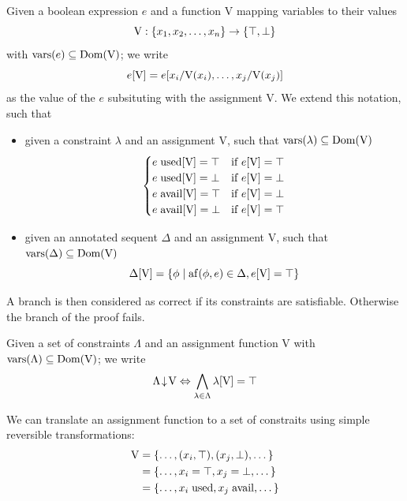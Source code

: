 \documentclass[a4paper, 12pt, english]{report}
\begin{document}
\begin{define}[Evaluation]
	Given a boolean expression $e$ and a function V mapping variables to their values 
	$$ \mathrm{V} : \{ x_1, x_2, \dots, x_n \} \rightarrow \{ \top, \bot \} $$
	with $\text{vars}(e) \subseteq \text{Dom}(\mathrm{V})$; we write
		$$ e[\mathrm{V}] = e[x_i / \mathrm{V}(x_i), \dots, x_j / \mathrm{V}(x_j)] $$
	as the value of the $e$ subsituting with the assignment V.
	We extend this notation, such that
	\begin{itemize}
		\item given a constraint $\lambda$ and an assignment V, such that $\text{vars}(\lambda) \subseteq \text{Dom}(\mathrm{V})$
			$$ 
			\begin{cases} 
				e \; \mathrm{used}[\mathrm{V}] = \top & \text{if } e[\mathrm{V}] = \top \\
				e \; \mathrm{used}[\mathrm{V}] = \bot & \text{if } e[\mathrm{V}] = \bot \\
				e \; \mathrm{avail}[\mathrm{V}] = \top & \text{if } e[\mathrm{V}] = \bot \\
				e \; \mathrm{avail}[\mathrm{V}] = \bot & \text{if } e[\mathrm{V}] = \top \\
			\end{cases}
			$$
		\item given an annotated sequent $\Delta$ and an assignment V, such that $\text{vars}(\Delta) \subseteq \text{Dom}(\mathrm{V})$
			$$ \Delta[\mathrm{V}] = \{ \phi \mid \mathrm{af}(\phi, e) \in \Delta , e[\mathrm{V}] = \top \} $$
	\end{itemize}
\end{define}
A branch is then considered as correct if its constraints are satisfiable.
Otherwise the branch of the proof fails.
\begin{define}
	\label{def:sat}
	Given a set of constraints $\Lambda$ and an assignment function V with $\text{vars}(\Lambda) \subseteq \text{Dom}(\mathrm{V})$; we write 
	$$ \Lambda\!\downarrow\!\mathrm{V} \Leftrightarrow \bigwedge_{\lambda \in \Lambda} \lambda[\mathrm{V}] = \top $$
\end{define}
\begin{fact}
	\label{fact:ass-trans}
	We can translate an assignment function to a set of constraits using simple reversible transformations:
	\begin{align*}
		\mathrm{V} &= \{ \dots, (x_i, \top), (x_j, \bot), \dots \} \\
		       &= \{ \dots, x_i = \top, x_j = \bot, \dots \} \\
		       &= \{ \dots, x_i \; \mathrm{used}, x_j \; \mathrm{avail}, \dots \}
	\end{align*}
\end{fact}
\end{document}
